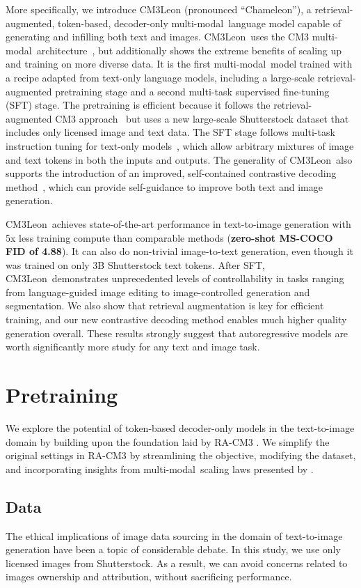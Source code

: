 \documentclass{article}
\newcommand{\model}{CM3Leon}
\newcommand{\mm}{multi-modal}
\begin{document}
More specifically, we introduce CM3Leon (pronounced ``Chameleon''), a retrieval-augmented, token-based, decoder-only \mm\ language model capable of generating and infilling both text and images. 
\model\ uses the CM3 \mm\ architecture~\citep{CM3}, but additionally shows the extreme benefits of scaling up and training on more diverse data. 
It is the first \mm\ model trained with a recipe adapted from text-only language models, including a large-scale retrieval-augmented pretraining stage and a second multi-task supervised fine-tuning (SFT) stage. 
The pretraining is efficient because it follows the retrieval-augmented CM3 approach~\citep{RA_CM3} but uses a new large-scale Shutterstock dataset that includes only licensed image and text data. The SFT stage follows multi-task instruction tuning for text-only models~\citet{instruct_opt}, which allow arbitrary mixtures of image and text tokens in both the inputs and outputs. 
The generality of \model\ also supports the introduction of an improved, self-contained contrastive decoding method~\cite {contrastive_decoding}, which can provide self-guidance to improve both text and image generation.  

\model\ achieves state-of-the-art performance in text-to-image generation with 5x less training compute than comparable methods (\textbf{zero-shot MS-COCO FID of 4.88}). 
It can also do non-trivial image-to-text generation, even though it was trained on only 3B Shutterstock text tokens. 
After SFT, \model\ demonstrates unprecedented levels of controllability in tasks ranging from language-guided image editing to image-controlled generation and segmentation.
We also show that retrieval augmentation is key for efficient training, and our new contrastive decoding method enables much higher quality generation overall. 
These results strongly suggest that autoregressive models are worth significantly more study for any text and image task. 

\section{Pretraining}

We explore the potential of token-based decoder-only models in the text-to-image domain by building upon the foundation laid by RA-CM3 \cite{RA_CM3}.  We simplify the original settings in RA-CM3 by streamlining the objective, modifying the dataset, and incorporating insights from \mm\ scaling laws presented by \cite{mm_scaling_laws}.

\subsection{Data}
The ethical implications of image data sourcing in the domain of text-to-image generation have been a topic of considerable debate. In this study, we use only licensed images from Shutterstock. As a result, we can avoid concerns related to images ownership and attribution, without sacrificing performance.
\end{document}
